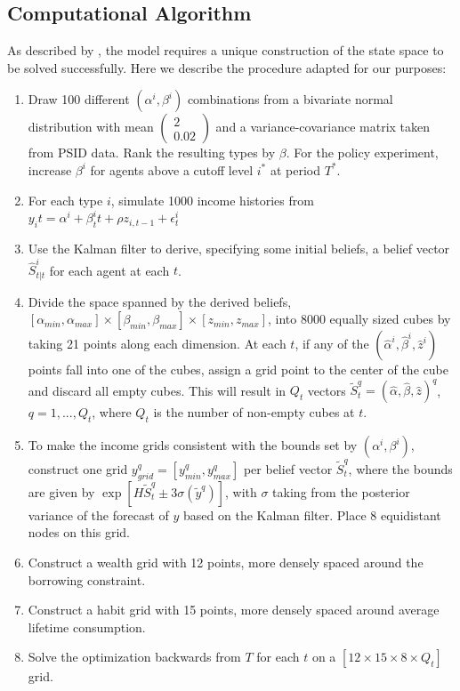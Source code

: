 \subsection{Computational Algorithm}
As described by \citet{Guvenen2007}, the model requires a unique construction of the state space to be solved successfully. Here we describe the procedure adapted for our purposes:
\begin{enumerate}
\item Draw 100 different $(\alpha^i, \beta^i)$ combinations from a bivariate normal distribution with mean {\tiny$\begin{pmatrix} 2 \\ 0.02 \end{pmatrix}$} and a variance-covariance matrix taken from PSID data. Rank the resulting types by $\beta$. For the policy experiment, increase $\beta^i$ for agents above a cutoff level $i^*$ at period $T^*$. 
\item For each type $i$, simulate 1000 income histories from $y_it=\alpha^i + \beta^i_t t + \rho z_{i,t-1} + \epsilon_t^i$
\item Use the Kalman filter to derive, specifying some initial beliefs, a belief vector $\hat{S}_{t|t}^i$ for each agent at each $t$.
\item Divide the space spanned by the derived beliefs, $[\alpha_{min},\alpha_{max}] \times [\beta_{min},\beta_{max}] \times [z_{min},z_{max}]$, into 8000 equally sized cubes by taking 21 points along each dimension. At each $t$, if any of the $(\hat{\alpha}^i,\hat{\beta}^i,\hat{z}^i)$ points fall into one of the cubes, assign a grid point to the center of the cube and discard all empty cubes. This will result in $Q_t$ vectors $\tilde{S}_t^q=(\hat{\alpha},\hat{\beta},\hat{z})^q$, $q=1,...,Q_t$, where $Q_t$ is the number of non-empty cubes at $t$.
\item To make the income grids consistent with the bounds set by $(\alpha^i, \beta^i)$, construct one grid $y_{grid}^q=[y_{min}^q,y_{max}^q]$ per belief vector $\tilde{S}_t^q$, where the bounds are given by $\exp[H\tilde{S}^q_t \pm 3 \sigma(\tilde{y}^q)]$, with $\sigma$ taking from the posterior variance of the forecast of $y$ based on the Kalman filter. Place 8 equidistant nodes on this grid.
\item Construct a wealth grid with 12 points, more densely spaced around the borrowing constraint.
\item Construct a habit grid with 15 points, more densely spaced around average lifetime consumption.
\item Solve the optimization backwards from $T$ for each $t$ on a $[12 \times 15 \times 8 \times Q_t]$ grid.
\end{enumerate}
